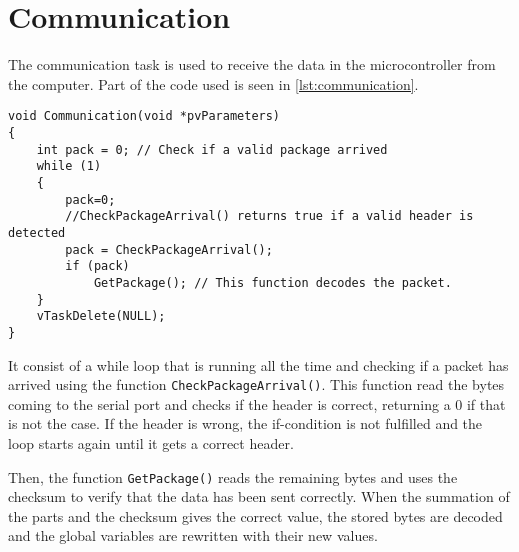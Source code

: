 \section{Communication}
The communication task is used to receive the data in the microcontroller from the computer. Part of the code used is seen in \autoref{lst:communication}.

\begin{lstlisting}[style=customcpp,
                caption={Code for the comunication task.}, 
                label=lst:communication]
void Communication(void *pvParameters)
{
	int pack = 0; // Check if a valid package arrived
    while (1)
    {
	    pack=0;
	    //CheckPackageArrival() returns true if a valid header is detected
        pack = CheckPackageArrival();
        if (pack)
            GetPackage(); // This function decodes the packet.
    }
    vTaskDelete(NULL);
}
\end{lstlisting}

It consist of a while loop that is running all the time and checking if a packet has arrived using the function \lstinline[style=customcppinline]{CheckPackageArrival()}. This function read the bytes coming to the serial port and checks if the header is correct, returning a 0 if that is not the case. If the header is wrong, the if-condition is not fulfilled and the loop starts again until it gets a correct header.

Then, the function \lstinline[style=customcppinline]{GetPackage()} reads the remaining bytes and uses the checksum to verify that the data has been sent correctly. When the summation of the parts and the checksum gives the correct value, the stored bytes are decoded and the global variables are rewritten with their new values.